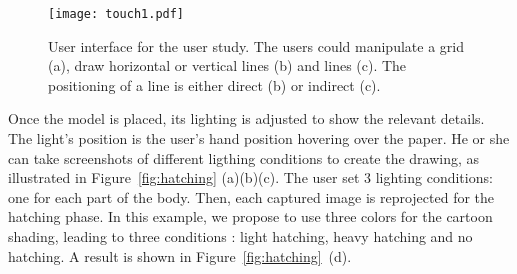 \documentclass{sigchi}
\begin{document}



    
\begin{figure}[htb]
  \centering 
  \texttt{[image: touch1.pdf]}
  \caption{User interface for the user study. The users could
    manipulate a grid (a), draw horizontal or vertical lines (b) and
    lines (c). The positioning of a line is either direct (b) or
    indirect (c).}
  \label{fig:interface}
\end{figure}
  
 
Once the model is placed, its lighting is adjusted to show the
relevant details. 
The light's position is the user's hand position hovering over the
paper. He or she can take screenshots of different ligthing conditions 
to create the drawing, as illustrated in Figure~\ref{fig:hatching}
(a)(b)(c). The user set 3 lighting
conditions: one for each part of the body. Then, each captured image
is reprojected for the hatching phase. 
In this example, we propose to use three colors for the cartoon
shading, leading to three conditions : light hatching, heavy hatching
and no hatching. A result is shown in Figure~\ref{fig:hatching}~(d).
  
  





\end{document}
